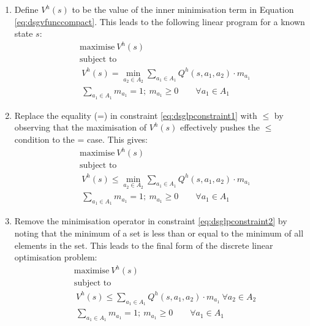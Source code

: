 \begin{enumerate}
  \item Define $V^h(s)$ to be the value of the inner minimisation term in
            Equation \eqref{eq:dsgvfunccompact}. This leads to the following linear program for a known state $s$:
{\small
\abovedisplayskip=10pt
\belowdisplayskip=0pt 
\begin{subequations}
\begin{align}
&\text{maximise}   \  V^{h}(s) \nonumber \\
&\text{subject to}   \nonumber \\
&\  V^{h}(s) = \min_{a_2 \in A_2} \sum_{a_1 \in A_1} Q^{h}(s, a_1, a_2) \cdot m_{a_{1}} \label{eq:dsglpconstraint1} \\
                          &\  \sum_{a_{1} \in A_1} m_{a_{1}} = 1 ; \  m_{a_{1}} \geq 0 \qquad \forall a_{1} \in A_1 \nonumber
\end{align}
\end{subequations}
}%

  \item Replace the equality (=) in constraint \eqref{eq:dsglpconstraint1} with
  $\leq$ by observing that the maximisation of $V^{h}(s)$
  effectively pushes the $\leq$ condition to the = case. This gives: 
{\small 
\abovedisplayskip=8pt
\belowdisplayskip=0pt
\begin{subequations}
\begin{align}
&\text{maximise}   \  V^{h}(s) \nonumber \\
&\text{subject to}   \nonumber \\
&\  V^{h}(s) \leq \min_{a_2 \in A_2} \sum_{a_1 \in A_1} Q^{h}(s, a_1, a_2) \cdot m_{a_{1}} \label{eq:dsglpconstraint2} \\
                          &\  \sum_{a_{1} \in A_1} m_{a_{1}} = 1 ; \  m_{a_{1}} \geq 0 \qquad \forall a_{1} \in A_1 \nonumber
\end{align}
\end{subequations}
}%
  
  \item Remove the minimisation operator in constraint \eqref{eq:dsglpconstraint2}
            by noting that the minimum of a set is less than or equal to the minimum of all elements in the set.
            This leads to the final form of the discrete linear optimisation problem:
{\small 
\abovedisplayskip=8pt
\belowdisplayskip=0pt
\begin{align*}
&\text{maximise}   \  V^{h}(s) \nonumber \\
&\text{subject to}   \nonumber \\
&\  V^{h}(s) \leq \sum_{a_1 \in A_1} Q^{h}(s, a_1, a_2) \cdot m_{a_{1}} \ \forall a_2 \in A_2\\
                          &\  \sum_{a_{1} \in A_1} m_{a_{1}} = 1 ; \  m_{a_{1}} \geq 0 \qquad \forall a_{1} \in A_1 \nonumber
\end{align*}
}%
\end{enumerate}

